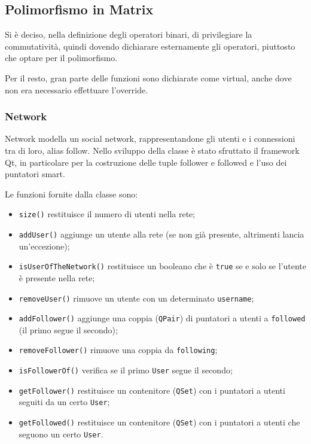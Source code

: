 \subsection{Polimorfismo in Matrix}


    Si è deciso, nella definizione degli operatori binari, di privilegiare la commutatività, quindi dovendo dichiarare
    esternamente gli operatori, piuttosto che optare per il polimorfismo.    

    Per il resto, gran parte delle funzioni sono dichiarate come virtual, anche dove non era necessario effettuare l'override.

\subsubsection{Network}
Network modella un social network, rappresentandone gli utenti e i connessioni tra di loro, alias follow.
Nello sviluppo della classe è stato sfruttato il framework Qt, in particolare per la costruzione delle tuple
follower e followed e l'uso dei puntatori smart.

 Le funzioni fornite dalla classe sono:
 \begin{itemize}
     \item \texttt{size()} restituisce il numero di utenti nella rete;
     \item \texttt{addUser()} aggiunge un utente alla rete (se non già presente, altrimenti lancia un'eccezione);
     \item \texttt{isUserOfTheNetwork()} restituisce un booleano che è \texttt{true} se e solo se l'utente è presente
     nella rete;
     \item \texttt{removeUser()} rimuove un utente con un determinato \texttt{username};
     \item \texttt{addFollower()} aggiunge una coppia (\texttt{QPair}) di puntatori a utenti a \texttt{followed} (il primo segue
     il secondo);
     \item \texttt{removeFollower()} rimuove una coppia da \texttt{following};
     \item \texttt{isFollowerOf()} verifica se il primo \texttt{User} segue il secondo;
     \item \texttt{getFollower()} restituisce un contenitore (\texttt{QSet}) con i puntatori a utenti seguiti da un certo \texttt{User};
     \item \texttt{getFollowed()} restituisce un contenitore (\texttt{QSet}) con i puntatori a utenti che seguono un certo \texttt{User}.
 \end{itemize}

